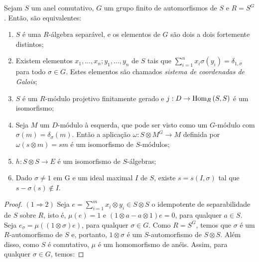 \begin{teo} \label{galois}
Sejam $S$ um anel comutativo, $G$ um grupo finito de automorfismos de $S$ e $R=S^G$. Então, são equivalentes:
\begin{enumerate}
    \item $S$ é uma $R$-álgebra separável, e os elementos de $G$ são dois a dois fortemente distintos;
    \item Existem elementos $x_1,\dots,x_n;y_1,\dots,y_n$ de $S$ tais que $\sum_{i=1}^{n}x_i\sigma(y_i)=\delta_{1,\sigma}$ para todo $\sigma \in G$. Estes elementos são chamados \emph{sistema de coordenadas de Galois};
    \item $S$ é um $R$-módulo projetivo finitamente gerado e $j: D \rightarrow \textrm{Hom}_{R}\left( S,S \right)$ é um isomorfismo;
    \item Seja $M$ um $D$-módulo à esquerda, que pode ser visto como um $G$-módulo com $\sigma(m)=\delta_\sigma(m)$. Então a aplicação $\omega: S\otimes M^G \rightarrow M$ definida por $\omega(s\otimes m)=sm$ é um isomorfismo de $S$-módulos;
    \item $h: S\otimes S \rightarrow E$ é um isomorfismo de $S$-álgebras;
    \item Dado $\sigma \neq 1$ em G e um ideal maximal $I$ de $S$, existe $s=s(I,\sigma)$ tal que $s-\sigma(s)\not\in I$.
\end{enumerate}
\begin{proof}
$(1\Rightarrow 2)$ 
Seja $e=\sum_{i=1}^m x_i \otimes y_i\in S\otimes S$ o idempotente de separabilidade de $S$ sobre $R$, isto é, $\mu (e) =1$ e $\left( 1\otimes a - a \otimes 1\right)e =0$, para qualquer $a \in S$. Seja $e_\sigma=\mu\left( (1\otimes \sigma)e \right)$, para qualquer $\sigma \in G$. Como $R=S^G$, temos que $\sigma$ é um $R$-automorfismo de $S$ e, portanto, $1 \otimes \sigma$ é um $S$-automorfismo de $S\otimes S$. Além disso, como $S$ é comutativo, $\mu$ é um homomorfismo de anéis. Assim, para qualquer $\sigma\in G$, temos:


\end{proof}
\end{teo}
